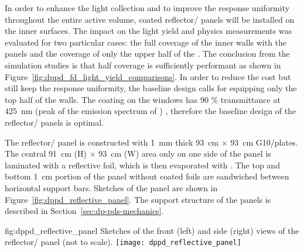 In order to enhance the light collection and to improve the  response uniformity throughout the entire  active volume,  coated reflector/ panels will be installed on the  inner surfaces. The impact on the light yield and physics measurements was evaluated for two particular cases: the full coverage of the  inner walls with the panels and the coverage of only the upper half of the . The conclusion from the simulation studies is that half coverage is sufficiently performant as shown in Figure~\ref{fig:dppd_fd_light_yield_comparisons}. In order to reduce the cost but still keep the  response uniformity, the baseline design calls for equipping only the top half of the  walls. The  coating on the  windows has \num{90} \% transmittance at \SI{425}{nm} (peak of the emission spectrum of ) \cite{Francini:2013lua}, therefore the baseline design of the reflector/ panels is optimal. 

The reflector/ panel is constructed with \SI{1}{\mm} thick \SI{93}{\cm} $\times$ \SI{93}{\cm} G10/\frfour plates. The central \SI{91}{\cm} (H) $\times$ \SI{93}{\cm} (W) area only on one side of the panel is laminated with a reflective foil, which is then evaporated with . The top and bottom \SI{1}{\cm} portion of the panel without coated foils are  sandwiched between horizontal support bars. Sketches of the panel are shown in Figure~\ref{fig:dppd_reflective_panel}. The support structure of the panels is described in Section~\ref{sec:dp-pds-mechanics}. 
\begin{dunefigure}{fig:dppd_reflective_panel}
{Sketches of the front (left) and side (right) views of the reflector/ panel (not to scale).}
\texttt{[image: dppd\_reflective\_panel]}
\end{dunefigure}

